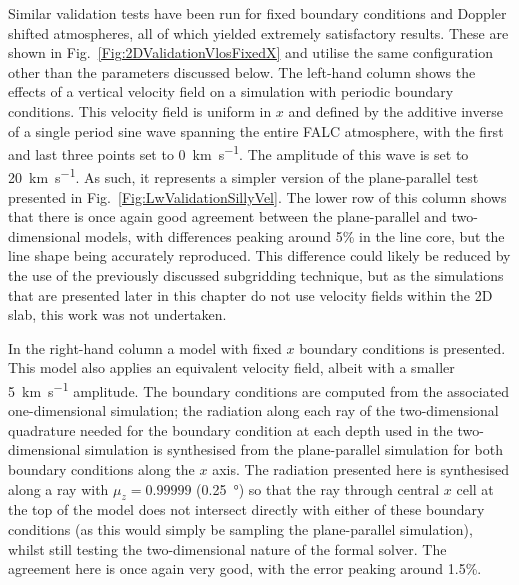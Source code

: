 Similar validation tests have been run for fixed boundary conditions and Doppler shifted atmospheres, all of which yielded extremely satisfactory results.
These are shown in Fig.~\ref{Fig:2DValidationVlosFixedX} and utilise the same configuration other than the parameters discussed below.
The left-hand column shows the effects of a vertical velocity field on a simulation with periodic boundary conditions.
This velocity field is uniform in $x$ and defined by the additive inverse of a single period sine wave spanning the entire FALC atmosphere, with the first and last three points set to \SI{0}{\kilo\metre\per\second}.
The amplitude of this wave is set to \SI{20}{\kilo\metre\per\second}.
As such, it represents a simpler version of the plane-parallel test presented in Fig.~\ref{Fig:LwValidationSillyVel}.
The lower row of this column shows that there is once again good agreement between the plane-parallel and two-dimensional models, with differences peaking around 5\% in the line core, but the line shape being accurately reproduced.
This difference could likely be reduced by the use of the previously discussed subgridding technique, but as the simulations that are presented later in this chapter do not use velocity fields within the 2D slab, this work was not undertaken.

In the right-hand column a model with fixed $x$ boundary conditions is presented.
This model also applies an equivalent velocity field, albeit with a smaller \SI{5}{\kilo\metre\per\second} amplitude.
The boundary conditions are computed from the associated one-dimensional simulation; the radiation along each ray of the two-dimensional quadrature needed for the boundary condition at each depth used in the two-dimensional simulation is synthesised from the plane-parallel simulation for both boundary conditions along the $x$ axis.
The radiation presented here is synthesised along a ray with $\mu_z=0.99999$ (\SI{0.25}{\degree}) so that the ray through central $x$ cell at the top of the model does not intersect directly with either of these boundary conditions (as this would simply be sampling the plane-parallel simulation), whilst still testing the two-dimensional nature of the formal solver.
The agreement here is once again very good, with the error peaking around 1.5\%.

